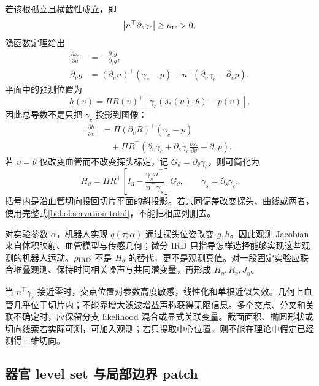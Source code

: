 \documentclass[11pt,a4paper]{article}
\numberwithin{equation}{section}
\theoremstyle{definition}
\newcommand{\abs}[1]{\left\lvert#1\right\rvert}
\begin{document}
若该根孤立且横截性成立，即
\begin{equation}
 \abs{n^\top\partial_s\gamma_c}\ge\kappa_{\rm tr}>0,
 \label{bel:transversality}
\end{equation}
隐函数定理给出
\begin{align}
 \frac{\partial s_*}{\partial\upsilon}
 &=-\frac{\partial_{\upsilon} g}{\partial_s g},\\
 \partial_{\upsilon} g
 &=(\partial_{\upsilon} n)^\top(\gamma_c-p)
 +n^\top(\partial_{\upsilon}\gamma_c-\partial_{\upsilon}p).
 \label{bel:root-jacobian}
\end{align}
平面中的预测位置为
\begin{equation}
 h(\upsilon)=\Pi R(\upsilon)^\top[\gamma_c(s_*(\upsilon);\theta)-p(\upsilon)].
 \label{bel:plane-observation}
\end{equation}
因此总导数不是只把 $\gamma_c$ 投影到图像：
\begin{align}
 \frac{\partial h}{\partial\upsilon}
 &=\Pi(\partial_{\upsilon}R)^\top(\gamma_c-p)\nonumber\\
 &\quad+\Pi R^\top\left(
 \partial_{\upsilon}\gamma_c+\partial_s\gamma_c\frac{\partial s_*}{\partial\upsilon}
 -\partial_{\upsilon}p\right).
 \label{bel:observation-total}
\end{align}
若 $\upsilon=\theta$ 仅改变血管而不改变探头标定，记
$G_\theta=\partial_\theta\gamma_c$，则可简化为
\begin{equation}
 H_\theta=\Pi R^\top
 \left[I_3-\frac{\gamma_s n^\top}{n^\top\gamma_s}\right]G_\theta,
 \qquad \gamma_s=\partial_s\gamma_c.
 \label{bel:observation-H}
\end{equation}
括号内是沿血管切向投回切片平面的斜投影。若共同偏差改变探头、曲线或两者，使用完整式\eqref{bel:observation-total}，不能把相应列删去。

对实验参数 $\alpha$，机器人实现 $q(\tau;\alpha)$ 通过探头位姿改变 $g,h$。因此观测 Jacobian 来自体积映射、血管模型与传感几何；微分 IRD 只指导怎样选择能够实现这些观测的机器人运动。$\rho_{\rm IRD}$ 不是 $H_\theta$ 的替代，更不是观测真值。对一段固定实验应联合堆叠观测、保持时间相关噪声与共同潜变量，再形成 $H_\eta,R_\eta,J_\eta$。

当 $n^\top\gamma_s$ 接近零时，交点位置对参数高度敏感，线性化和单根近似失效。几何上血管几乎位于切片内；不能靠增大滤波增益声称获得无限信息。多个交点、分叉和关联不确定时，应保留分支 likelihood 混合或显式关联变量。截面面积、椭圆形状或切向线索若实际可测，可加入观测；若只提取中心位置，则不能在理论中假定已经测得三维切向。

\subsection{器官 level set 与局部边界 patch}
\label{bel:organ}
\end{document}
